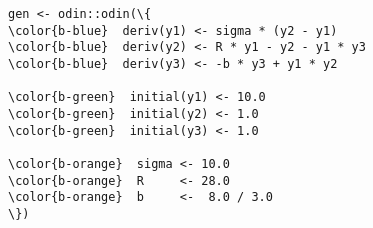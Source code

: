 \documentclass[class=minimal,border=0]{standalone}
\begin{document}
%
\begin{BVerbatim}[bgcolor=b-darkgrey]
gen <- odin::odin(\{
\color{b-blue}  deriv(y1) <- sigma * (y2 - y1)
\color{b-blue}  deriv(y2) <- R * y1 - y2 - y1 * y3
\color{b-blue}  deriv(y3) <- -b * y3 + y1 * y2

\color{b-green}  initial(y1) <- 10.0
\color{b-green}  initial(y2) <- 1.0
\color{b-green}  initial(y3) <- 1.0

\color{b-orange}  sigma <- 10.0
\color{b-orange}  R     <- 28.0
\color{b-orange}  b     <-  8.0 / 3.0
\})
\end{BVerbatim}
\end{document}

